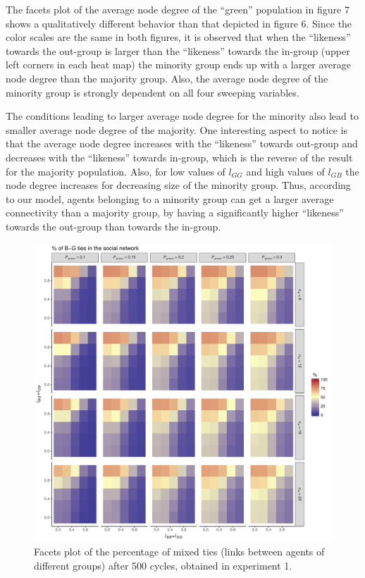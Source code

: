 The facets plot of the average node degree of the ``green'' population in figure 7 shows a qualitatively different behavior than that depicted in figure 6. Since the color scales are the same in both figures, it is observed that when the ``likeness'' towards the out-group is larger than the ``likeness'' towards the in-group (upper left corners in each heat map) the minority group ends up with a larger average node degree than the majority group. Also, the average node degree of the minority group is strongly dependent on all four sweeping variables.

The conditions leading to larger average node degree for the minority also lead to smaller average node degree of the majority. One interesting aspect to notice is that the average node degree increases with the ``likeness'' towards out-group and decreases with the ``likeness'' towards in-group, which is the reverse of the result for the majority population. Also, for low values of $ l_{GG} $ and high values of $ l_{GB} $  the node degree increases for decreasing size of the minority group. Thus, according to our model, agents belonging to a minority group can get a larger average connectivity than a majority group, by having a significantly higher ``likeness'' towards the out-group than towards the in-group. 
\begin{figure}[ht!]
	\label{fig:pctMixedTiesExperiment1}
	\begin{minipage}[c]{0.2\linewidth}
		\caption{Facets plot of the percentage of mixed ties (links between agents of different groups) after 500 cycles, obtained in experiment 1.}
	\end{minipage}
	\begin{minipage}[c]{0.75\linewidth}
		\includegraphics[trim={0cm 0cm 0.4cm 0cm}, clip, width=\linewidth]{figures/pctMixedTiesExperiment1.pdf}
	\end{minipage}
\end{figure}

